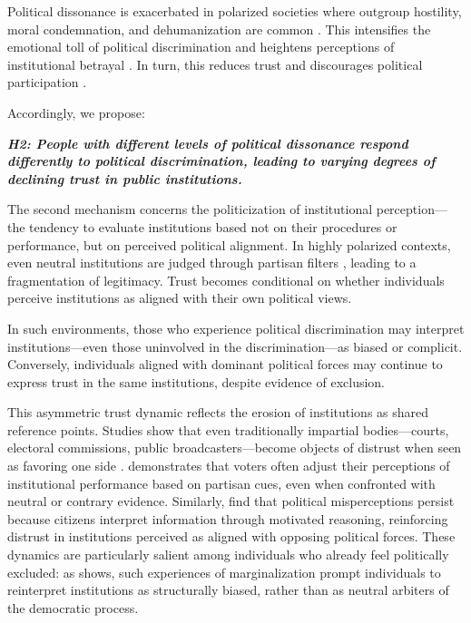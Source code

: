 \documentclass{article}
\begin{document}
Political dissonance is exacerbated in polarized societies where outgroup hostility, moral condemnation, and dehumanization are common \parencite{iyengar_fear_2015}. This intensifies the emotional toll of political discrimination and heightens perceptions of institutional betrayal \parencite{hetherington_why_2015}. In turn, this reduces trust and discourages political participation \parencite{michelson_corrosive_2003, lelkes_limits_2017}.

Accordingly, we propose:

\emph{\textbf{\small
H2: People with different levels of political dissonance respond differently to political discrimination, leading to varying degrees of declining trust in public institutions.
}}

The second mechanism concerns the politicization of institutional perception—the tendency to evaluate institutions based not on their procedures or performance, but on perceived political alignment. In highly polarized contexts, even neutral institutions are judged through partisan filters \parencite{rogowski_how_2016, druckman_what_2019}, leading to a fragmentation of legitimacy. Trust becomes conditional on whether individuals perceive institutions as aligned with their own political views.

In such environments, those who experience political discrimination may interpret institutions—even those uninvolved in the discrimination—as biased or complicit. Conversely, individuals aligned with dominant political forces may continue to express trust in the same institutions, despite evidence of exclusion.

This asymmetric trust dynamic reflects the erosion of institutions as shared reference points. Studies show that even traditionally impartial bodies—courts, electoral commissions, public broadcasters—become objects of distrust when seen as favoring one side \parencite{keefer_trust_2022}. \textcite{lenz_follow_2012} demonstrates that voters often adjust their perceptions of institutional performance based on partisan cues, even when confronted with neutral or contrary evidence. Similarly, \textcite{nyhan_when_2010} find that political misperceptions persist because citizens interpret information through motivated reasoning, reinforcing distrust in institutions perceived as aligned with opposing political forces. These dynamics are particularly salient among individuals who already feel politically excluded: as \textcite{oskooii_perceived_2020} shows, such experiences of marginalization prompt individuals to reinterpret institutions as structurally biased, rather than as neutral arbiters of the democratic process. 
\end{document}
